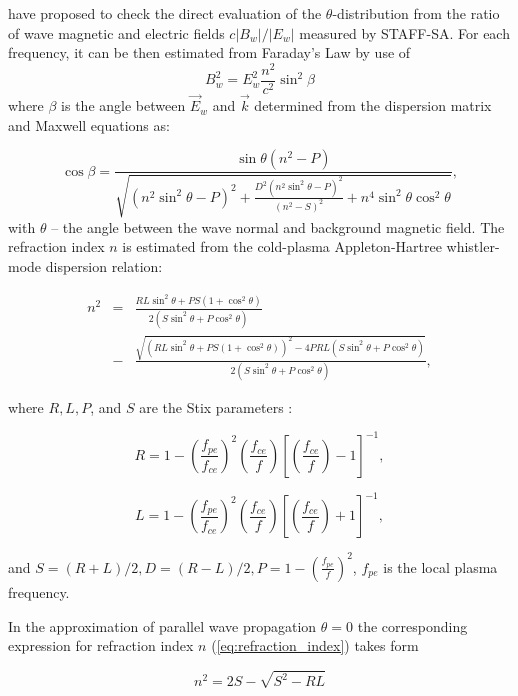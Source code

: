 \documentclass[a4paper]{article}
\begin{document}
\citet{agapitov2013statistics} have proposed to check the direct evaluation of the $\theta$-distribution from the ratio of wave magnetic and electric fields $c|B_w|/|E_w|$ measured by STAFF-SA. For each frequency, it can be then estimated from Faraday's Law by use of
\begin{equation}
B_w^2=E_w^2\frac{n^2}{c^2}\sin^2\beta \label{eq:faraday_law}
\end{equation}
where $\beta$ is the angle between $\vec{E}_w$ and  $\vec{k}$ determined from the dispersion matrix and Maxwell equations as:

\begin{equation}
\cos \beta = \frac{\sin \theta
(n^2-P)}{\sqrt{(n^2\sin^2\theta-P)^2+\frac{D^2(n^2\sin^2\theta-P)^2}{(n^2-S)^2}+n^4\sin^2\theta
\cos^2\theta}}, \label{eq:beta_dispersion}
\end{equation}
with $\theta$ -- the angle between the wave normal and background magnetic field.
The refraction index $n$ is estimated from the cold-plasma Appleton-Hartree whistler-mode dispersion relation:

\begin{eqnarray}
 n^2 &=& \frac{{RL\sin ^2 \theta  + PS(1 + \cos ^2 \theta )}}{{2\left( {S\sin ^2 \theta  + P\cos ^2 \theta } \right)}}     \nonumber \\
   &-& \frac{{\sqrt {\left( {RL\sin ^2 \theta  + PS(1 + \cos ^2 \theta )} \right)^2  - 4PRL\left( {S\sin ^2 \theta  + P\cos ^2 \theta } \right)} }}{{2\left( {S\sin ^2 \theta  + P\cos ^2 \theta } \right)}},
\label{eq:refraction_index}
\end{eqnarray}


where $R,L,P$, and $S$ are the Stix parameters \citep{stix1962theory}:

\[
R = 1 -\left( \frac{f_{pe}}{f_{ce}} \right)^2 \left(
\frac{f_{ce}}{f} \right)\left[\left( \frac{f_{ce}}{f}
\right)-1\right]^{-1},
\]

\[
  L = 1 - \left( \frac{f_{pe}}{f_{ce}} \right)^2 \left( \frac{f_{ce}}{f} \right)\left[\left( \frac{f_{ce}}{f} \right)+1\right]^{-1},
\]

and $  S = (R+L)/2,   D = (R-L)/2,   P = 1 - \left(\frac{f_{pe}}{f}\right)^2$, $f_{pe}$ is the local plasma
frequency.

In the approximation of parallel wave propagation $\theta = 0$ the corresponding expression for refraction index $n$ (\ref{eq:refraction_index}) takes form

\begin{equation}
 n^2 = 2S - \sqrt {S^2  - RL}
\label{eq:refractive_index_zero}
\end{equation}
\end{document}
